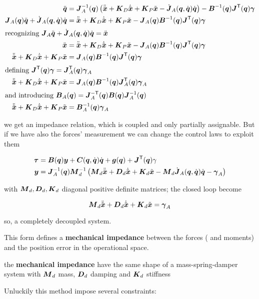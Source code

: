 \begin{align*}
	\ddq &= \J_A^\inv(\q) \left( \ddxd + \K_D\dxe + \K_P \xe - \dJ_A(\q,\dq)\dq \right) - \B^\inv(\q)\J^\trans(\q)\vect\gamma \\
	\J_A(\q)\ddq + \dJ_A(\q,\dq)\dq &= \ddxd + \K_D\dxe + \K_P \xe - \J_A(\q)\B^\inv(\q)\J^\trans(\q)\vect\gamma \\
	\intertext{recognizing $\J_A\ddq + \dJ_A(\q,\dq)\dq = \ddx$}
	\ddx &= \ddxd + \K_D\dxe + \K_P \xe - \J_A(\q)\B^\inv(\q)\J^\trans(\q)\vect\gamma \\
	\ddxe + \K_D\dxe + \K_P \xe &= \J_A(\q)\B^\inv(\q)\J^\trans(\q)\vect\gamma \\
	\intertext{defining $\J^\trans(\q)\vect\gamma = \J_A^\trans(\q)\vect\gamma_A$}
	\ddxe + \K_D\dxe + \K_P \xe &= \J_A(\q)\B^\inv(\q)\J_A^\trans(\q)\vect\gamma_A \\
	\intertext{and introducing $\B_A(\q) = \J_A^{-\trans}(\q)\B(\q)\J_A^\inv(\q)$}
	\ddxe + \K_D\dxe + \K_P \xe &= \B_A^\inv(\q)\vect\gamma_A
\end{align*}

we get an impedance relation, which is coupled and only partially assignable.
But if we have also the forces' measurement we can change the control laws to exploit them

\begin{align*}
    \vect\tau &= \B(\q)\y + \C(\q,\dq)\dq + \g(\q) + \J^\trans(\q)\gamma \\
    \y &= \J_A^\inv(\q) \matr M_d^\inv \left( \matr M_d \ddxd + \matr D_d\dxe + \K_d \xe - \matr M_d \dJ_A(\q,\dq)\dq - \vect\gamma_A \right)
\end{align*}

with $\matr M_d, \matr D_d, \K_d$ diagonal positive definite matrices;
the closed loop become

\[
	\matr M_d \ddxe + \matr D_d \dxe + \K_d \xe = \vect\gamma_A
\]

so, a completely decoupled system.

This form defines a \textbf{mechanical impedance} between the forces ( and moments) and the position error in the operational space.

\begin{nb}the \textbf{mechanical impedance} have the same shape of a mass-spring-damper system  with $\matr M_d$ mass, $\matr D_d$ damping and $\K_d$ stiffness\end{nb}

Unluckily this method impose several constraints:


